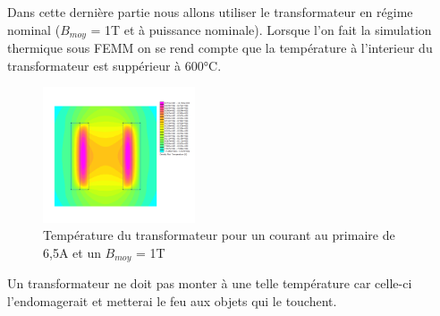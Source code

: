 Dans cette dernière partie nous allons utiliser le transformateur en régime nominal ($B_{moy}$ = 1T et à puissance nominale).  Lorsque l'on fait la simulation thermique sous FEMM on se rend compte que la température à l'interieur du transformateur est suppérieur à 600°C. 
\begin{figure}[ht]
	\begin{center}
	\includegraphics[width=0.40\textwidth]{images/TP3_thermo}
	\caption{Température du transformateur pour un courant au primaire de 6,5A et un $B_{moy}$ = 1T}\label{img:TransfoThermo}
	\end{center}
\end{figure}

Un transformateur ne doit pas monter à une telle température car celle-ci l'endomagerait et metterai le feu aux objets qui le touchent.


